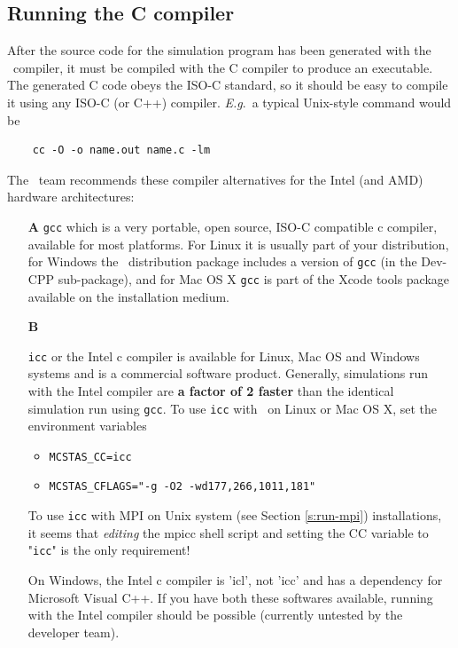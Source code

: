 \subsection{Running the C compiler}
\label{s:compile}

After the source code for the simulation program has been generated with
the \MCX\ compiler, it must be compiled with the C compiler to produce
an executable. The generated C code obeys the ISO-C standard, so it
should be easy to compile it using any ISO-C (or C++) compiler. \textit{E.g}.\ a
typical Unix-style command would be
\begin{verbatim}
    cc -O -o name.out name.c -lm
\end{verbatim}
The \MCX\ team recommends these compiler alternatives for the Intel
(and AMD) hardware architectures:
\begin{itemize}
\item[\bf A]{\verb+gcc+ which is a very portable, open source, ISO-C
    compatible c compiler, available for most platforms. For Linux it
    is usually part of your distribution, for Windows the \MCX\
    distribution package includes a version of \verb+gcc+
    (in the Dev-CPP sub-package), and for Mac OS X \verb+gcc+ is part
    of the Xcode tools package available on the installation medium.}
\item[\bf B]{\verb+icc+ or the Intel c compiler is available for Linux, Mac
    OS and Windows systems and is a commercial software
    product. Generally, simulations run with the Intel compiler are
    {\bf a factor of 2 faster} than the identical simulation run using \verb+gcc+. To use \verb+icc+ with \MCX\ on Linux or Mac OS X, set the environment variables
    \begin{itemize}
      \item{\verb+MCSTAS_CC=icc+}
      \item{\verb+MCSTAS_CFLAGS="-g -O2 -wd177,266,1011,181"+}
    \end{itemize}
    To use \verb+icc+ with MPI on Unix system (see Section \ref{s:run-mpi})
 installations, it seems that \emph{editing}
    the mpicc shell script and setting the CC variable to "\verb+icc+" is the
    only requirement!}
    On Windows, the Intel c compiler is 'icl', not 'icc' and has a dependency for Microsoft Visual C++. If you have both these softwares available, running \MCX  with the Intel compiler should be possible (currently untested by the \MCX  developer team).

\end{itemize}


